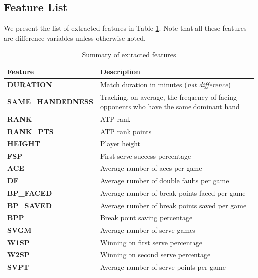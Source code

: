 \documentclass[paper=a4, fontsize=11pt]{scrartcl} %
\numberwithin{equation}{section} %
\numberwithin{figure}{section} %
\numberwithin{table}{section} %
\begin{document}
\subsection{Feature List}
We present the list of extracted features in Table \ref{tab:features}. Note that all these features are difference variables unless otherwise noted. 
\begin{center}
\begin{table}[h]
    \begin{tabular}{  l | p{10cm} }
    \hline
    Feature  & Description \\ \hline
    \textbf{DURATION}  & Match duration in minutes (\textit{not difference}) \\ \hline
    \textbf{SAME\_HANDEDNESS}  & Tracking, on average, the frequency of facing opponents who have the same dominant hand \\ \hline
    \textbf{RANK}  & ATP rank \\ \hline
    \textbf{RANK\_PTS}  & ATP rank points \\ \hline
    \textbf{HEIGHT}  & Player height \\ \hline
    \textbf{FSP}  & First serve success percentage \\ \hline
    \textbf{ACE}  & Average number of aces per game \\ \hline
    \textbf{DF}  & Average number of double faults per game \\ \hline
    \textbf{BP\_FACED}  & Average number of break points faced per game \\ \hline
    \textbf{BP\_SAVED}  & Average number of break points saved per game \\ \hline
    \textbf{BPP}  & Break point saving percentage \\ \hline
    \textbf{SVGM}  & Average number of serve games \\ \hline
    \textbf{W1SP}  & Winning on first serve percentage \\ \hline
    \textbf{W2SP}  & Winning on second serve percentage \\ \hline
    \textbf{SVPT}  & Average number of serve points per game \\ \hline
    \end{tabular}
    \caption{Summary of extracted features}
    \label{tab:features}
    \end{table}
\end{center}
\end{document}
